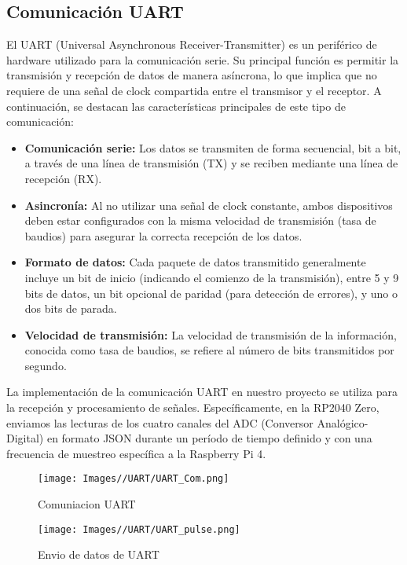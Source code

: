 \documentclass{article}
\begin{document}
\subsection{Comunicación UART}

El UART (Universal Asynchronous Receiver-Transmitter) es un periférico de hardware utilizado para la comunicación serie. Su principal función es permitir la transmisión y recepción de datos de manera asíncrona, lo que implica que no requiere de una señal de clock compartida entre el transmisor y el receptor. A continuación, se destacan las características principales de este tipo de comunicación:

\begin{itemize}
    \item \textbf{Comunicación serie:} Los datos se transmiten de forma secuencial, bit a bit, a través de una línea de transmisión (TX) y se reciben mediante una línea de recepción (RX).
    \item \textbf{Asincronía:} Al no utilizar una señal de clock constante, ambos dispositivos deben estar configurados con la misma velocidad de transmisión (tasa de baudios) para asegurar la correcta recepción de los datos.
    \item \textbf{Formato de datos:} Cada paquete de datos transmitido generalmente incluye un bit de inicio (indicando el comienzo de la transmisión), entre 5 y 9 bits de datos, un bit opcional de paridad (para detección de errores), y uno o dos bits de parada.
    \item \textbf{Velocidad de transmisión:} La velocidad de transmisión de la información, conocida como tasa de baudios, se refiere al número de bits transmitidos por segundo.
\end{itemize}

La implementación de la comunicación UART en nuestro proyecto se utiliza para la recepción y procesamiento de señales. Específicamente, en la RP2040 Zero, enviamos las lecturas de los cuatro canales del ADC (Conversor Analógico-Digital) en formato JSON durante un período de tiempo definido y con una frecuencia de muestreo específica a la Raspberry Pi 4.

\begin{figure}[H]
    \centering
    \texttt{[image: Images//UART/UART\_Com.png]}
    \caption{Comuniacion UART}
    \label{fig:enter-label}
\end{figure}

\begin{figure}[H]
    \centering
    \texttt{[image: Images//UART/UART\_pulse.png]}
    \caption{Envio de datos de UART}
    \label{fig:enter-label}
\end{figure}
\end{document}

